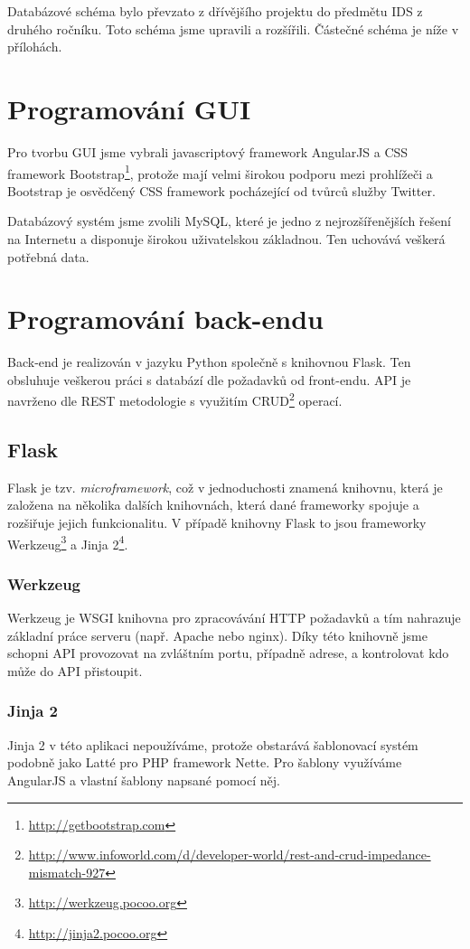 \documentclass[11pt,a4paper]{article}
\begin{document}
Databázové schéma bylo převzato z dřívějšího projektu do předmětu IDS z druhého ročníku. Toto schéma jsme upravili a rozšířili. Částečné schéma je níže v přílohách.

\section*{Programování GUI}
Pro tvorbu GUI jsme vybrali javascriptový framework AngularJS a CSS framework Bootstrap\footnote{\url{http://getbootstrap.com}}, protože mají velmi širokou podporu mezi prohlížeči a Bootstrap je osvědčený CSS framework pocházející od tvůrců služby Twitter.

Databázový systém jsme zvolili MySQL, které je jedno z nejrozšířenějších řešení na Internetu a disponuje širokou uživatelskou základnou. Ten uchovává veškerá potřebná data.

\section*{Programování back-endu}
Back-end je realizován v jazyku Python společně s knihovnou Flask. Ten obsluhuje veškerou práci s databází dle požadavků od front-endu. API je navrženo dle REST metodologie\cite{rest} s využitím CRUD\footnote{\url{http://www.infoworld.com/d/developer-world/rest-and-crud-impedance-mismatch-927}} operací.

\subsection*{Flask}
Flask je tzv. {\em microframework}, což v jednoduchosti znamená knihovnu, která je založena na několika dalších knihovnách, která dané frameworky spojuje a rozšiřuje jejich funkcionalitu. V případě knihovny Flask to jsou frameworky Werkzeug\footnote{\url{http://werkzeug.pocoo.org}} a Jinja 2\footnote{\url{http://jinja2.pocoo.org}}.

\subsubsection*{Werkzeug}
Werkzeug je WSGI knihovna pro zpracovávání HTTP požadavků a tím nahrazuje základní práce serveru (např. Apache nebo nginx). Díky této knihovně jsme schopni API provozovat na zvláštním portu, případně adrese, a kontrolovat kdo může do API přistoupit.

\subsubsection*{Jinja 2}
Jinja 2 v této aplikaci nepoužíváme, protože obstarává šablonovací systém podobně jako Latté pro PHP framework Nette. Pro šablony využíváme AngularJS a vlastní šablony napsané pomocí něj.
\end{document}
